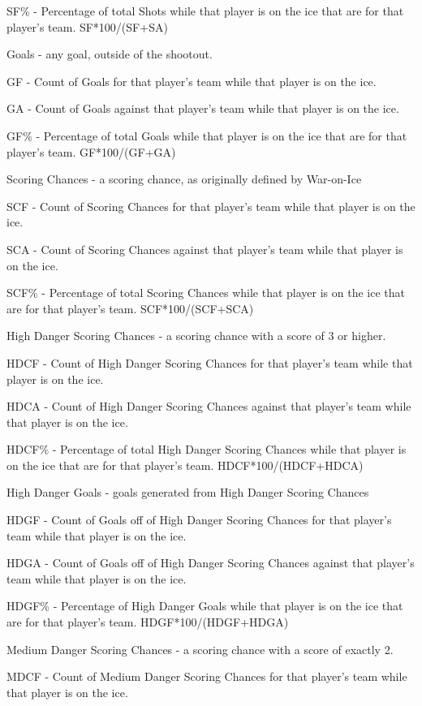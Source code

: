 \documentclass[12pt]{article}
\begin{document}
SF\% - Percentage of total Shots while that player is on the ice that are for that player's team. SF*100/(SF+SA)

Goals - any goal, outside of the shootout.

GF - Count of Goals for that player's team while that player is on the ice.

GA - Count of Goals against that player's team while that player is on the ice.

GF\% - Percentage of total Goals while that player is on the ice that are for that player's team. GF*100/(GF+GA)

Scoring Chances - a scoring chance, as originally defined by War-on-Ice

SCF - Count of Scoring Chances for that player's team while that player is on the ice.

SCA - Count of Scoring Chances against that player's team while that player is on the ice.

SCF\% - Percentage of total Scoring Chances while that player is on the ice that are for that player's team. SCF*100/(SCF+SCA)

High Danger Scoring Chances - a scoring chance with a score of 3 or higher.

HDCF - Count of High Danger Scoring Chances for that player's team while that player is on the ice.

HDCA - Count of High Danger Scoring Chances against that player's team while that player is on the ice.

HDCF\% - Percentage of total High Danger Scoring Chances while that player is on the ice that are for that player's team. HDCF*100/(HDCF+HDCA)

High Danger Goals - goals generated from High Danger Scoring Chances

HDGF - Count of Goals off of High Danger Scoring Chances for that player's team while that player is on the ice.

HDGA - Count of Goals off of High Danger Scoring Chances against that player's team while that player is on the ice.

HDGF\% - Percentage of High Danger Goals while that player is on the ice that are for that player's team. HDGF*100/(HDGF+HDGA)

Medium Danger Scoring Chances - a scoring chance with a score of exactly 2.

MDCF - Count of Medium Danger Scoring Chances for that player's team while that player is on the ice.
\end{document}
